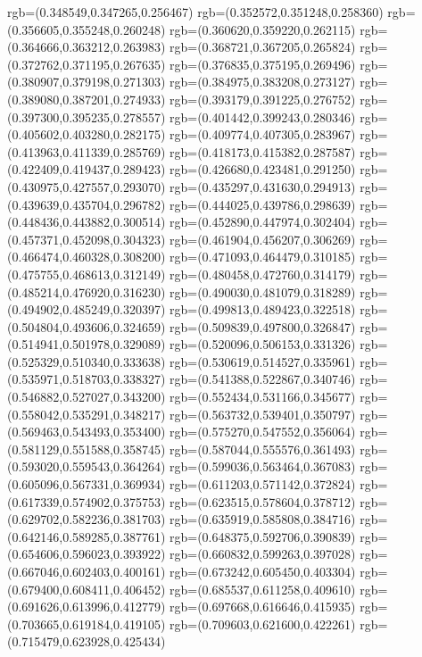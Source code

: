 {{{			rgb=(0.348549,0.347265,0.256467)
			rgb=(0.352572,0.351248,0.258360)
			rgb=(0.356605,0.355248,0.260248)
			rgb=(0.360620,0.359220,0.262115)
			rgb=(0.364666,0.363212,0.263983)
			rgb=(0.368721,0.367205,0.265824)
			rgb=(0.372762,0.371195,0.267635)
			rgb=(0.376835,0.375195,0.269496)
			rgb=(0.380907,0.379198,0.271303)
			rgb=(0.384975,0.383208,0.273127)
			rgb=(0.389080,0.387201,0.274933)
			rgb=(0.393179,0.391225,0.276752)
			rgb=(0.397300,0.395235,0.278557)
			rgb=(0.401442,0.399243,0.280346)
			rgb=(0.405602,0.403280,0.282175)
			rgb=(0.409774,0.407305,0.283967)
			rgb=(0.413963,0.411339,0.285769)
			rgb=(0.418173,0.415382,0.287587)
			rgb=(0.422409,0.419437,0.289423)
			rgb=(0.426680,0.423481,0.291250)
			rgb=(0.430975,0.427557,0.293070)
			rgb=(0.435297,0.431630,0.294913)
			rgb=(0.439639,0.435704,0.296782)
			rgb=(0.444025,0.439786,0.298639)
			rgb=(0.448436,0.443882,0.300514)
			rgb=(0.452890,0.447974,0.302404)
			rgb=(0.457371,0.452098,0.304323)
			rgb=(0.461904,0.456207,0.306269)
			rgb=(0.466474,0.460328,0.308200)
			rgb=(0.471093,0.464479,0.310185)
			rgb=(0.475755,0.468613,0.312149)
			rgb=(0.480458,0.472760,0.314179)
			rgb=(0.485214,0.476920,0.316230)
			rgb=(0.490030,0.481079,0.318289)
			rgb=(0.494902,0.485249,0.320397)
			rgb=(0.499813,0.489423,0.322518)
			rgb=(0.504804,0.493606,0.324659)
			rgb=(0.509839,0.497800,0.326847)
			rgb=(0.514941,0.501978,0.329089)
			rgb=(0.520096,0.506153,0.331326)
			rgb=(0.525329,0.510340,0.333638)
			rgb=(0.530619,0.514527,0.335961)
			rgb=(0.535971,0.518703,0.338327)
			rgb=(0.541388,0.522867,0.340746)
			rgb=(0.546882,0.527027,0.343200)
			rgb=(0.552434,0.531166,0.345677)
			rgb=(0.558042,0.535291,0.348217)
			rgb=(0.563732,0.539401,0.350797)
			rgb=(0.569463,0.543493,0.353400)
			rgb=(0.575270,0.547552,0.356064)
			rgb=(0.581129,0.551588,0.358745)
			rgb=(0.587044,0.555576,0.361493)
			rgb=(0.593020,0.559543,0.364264)
			rgb=(0.599036,0.563464,0.367083)
			rgb=(0.605096,0.567331,0.369934)
			rgb=(0.611203,0.571142,0.372824)
			rgb=(0.617339,0.574902,0.375753)
			rgb=(0.623515,0.578604,0.378712)
			rgb=(0.629702,0.582236,0.381703)
			rgb=(0.635919,0.585808,0.384716)
			rgb=(0.642146,0.589285,0.387761)
			rgb=(0.648375,0.592706,0.390839)
			rgb=(0.654606,0.596023,0.393922)
			rgb=(0.660832,0.599263,0.397028)
			rgb=(0.667046,0.602403,0.400161)
			rgb=(0.673242,0.605450,0.403304)
			rgb=(0.679400,0.608411,0.406452)
			rgb=(0.685537,0.611258,0.409610)
			rgb=(0.691626,0.613996,0.412779)
			rgb=(0.697668,0.616646,0.415935)
			rgb=(0.703665,0.619184,0.419105)
			rgb=(0.709603,0.621600,0.422261)
			rgb=(0.715479,0.623928,0.425434)
}}}
